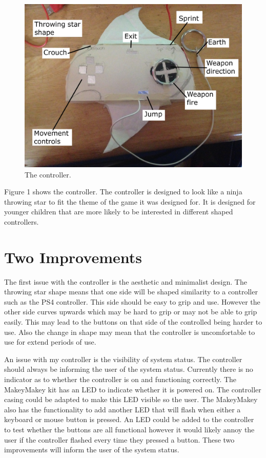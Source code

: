 \documentclass{scrartcl}
\begin{document}
\begin{figure}[h]
	\includegraphics[width=1.0\linewidth]{Controller.jpg}
	\caption{ The controller.}
\end{figure}
Figure 1 shows the controller. The controller is designed to look like a ninja throwing star to fit the theme of the game it was designed for. It is designed for younger children that are more likely to be interested in different shaped controllers.


\section{Two Improvements}

The first issue with the controller is the aesthetic and minimalist design. The throwing star shape means that one side will be shaped similarity to a controller such as the PS4 controller. This side should be easy to grip and use. However the other side curves upwards which may be hard to grip or may not be able to grip easily. This may lead to the buttons on that side of the controlled being harder to use. Also the change in shape may mean that the controller is uncomfortable to use for extend periods of use. %

An issue with my controller is the visibility of system status. The controller should always be informing the user of the system status. Currently there is no indicator as to whether the controller is on and functioning correctly. The MakeyMakey kit has an LED to indicate whether it is powered on. The controller casing could be adapted to make this LED visible so the user. The MakeyMakey also has the functionality to add another LED that will flash when either a keyboard or mouse button is pressed. An LED could be added to the controller to test whether the buttons are all functional however it would likely annoy the user if the controller flashed every time they pressed a button. These two improvements will inform the user of the system status. 
\end{document}
